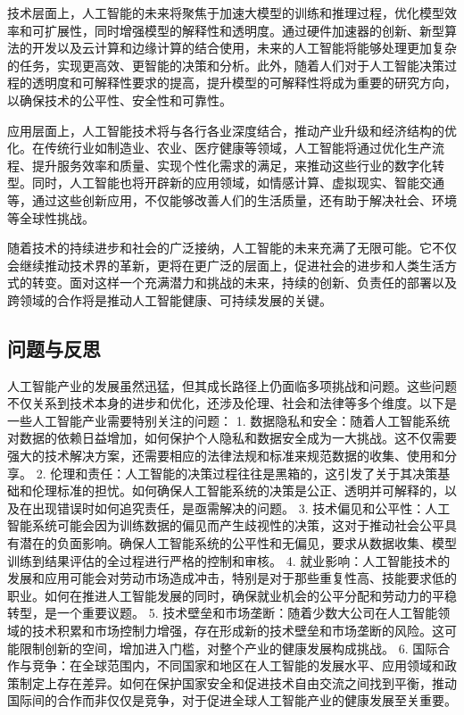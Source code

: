 技术层面上，人工智能的未来将聚焦于加速大模型的训练和推理过程，优化模型效率和可扩展性，同时增强模型的解释性和透明度。通过硬件加速器的创新、新型算法的开发以及云计算和边缘计算的结合使用，未来的人工智能将能够处理更加复杂的任务，实现更高效、更智能的决策和分析。此外，随着人们对于人工智能决策过程的透明度和可解释性要求的提高，提升模型的可解释性将成为重要的研究方向，以确保技术的公平性、安全性和可靠性。

应用层面上，人工智能技术将与各行各业深度结合，推动产业升级和经济结构的优化。在传统行业如制造业、农业、医疗健康等领域，人工智能将通过优化生产流程、提升服务效率和质量、实现个性化需求的满足，来推动这些行业的数字化转型。同时，人工智能也将开辟新的应用领域，如情感计算、虚拟现实、智能交通等，通过这些创新应用，不仅能够改善人们的生活质量，还有助于解决社会、环境等全球性挑战。

随着技术的持续进步和社会的广泛接纳，人工智能的未来充满了无限可能。它不仅会继续推动技术界的革新，更将在更广泛的层面上，促进社会的进步和人类生活方式的转变。面对这样一个充满潜力和挑战的未来，持续的创新、负责任的部署以及跨领域的合作将是推动人工智能健康、可持续发展的关键。

\subsection{问题与反思}
人工智能产业的发展虽然迅猛，但其成长路径上仍面临多项挑战和问题。这些问题不仅关系到技术本身的进步和优化，还涉及伦理、社会和法律等多个维度。以下是一些人工智能产业需要特别关注的问题：
1. 数据隐私和安全：随着人工智能系统对数据的依赖日益增加，如何保护个人隐私和数据安全成为一大挑战。这不仅需要强大的技术解决方案，还需要相应的法律法规和标准来规范数据的收集、使用和分享。
2. 伦理和责任：人工智能的决策过程往往是黑箱的，这引发了关于其决策基础和伦理标准的担忧。如何确保人工智能系统的决策是公正、透明并可解释的，以及在出现错误时如何追究责任，是亟需解决的问题。
3. 技术偏见和公平性：人工智能系统可能会因为训练数据的偏见而产生歧视性的决策，这对于推动社会公平具有潜在的负面影响。确保人工智能系统的公平性和无偏见，要求从数据收集、模型训练到结果评估的全过程进行严格的控制和审核。
4. 就业影响：人工智能技术的发展和应用可能会对劳动市场造成冲击，特别是对于那些重复性高、技能要求低的职业。如何在推进人工智能发展的同时，确保就业机会的公平分配和劳动力的平稳转型，是一个重要议题。
5. 技术壁垒和市场垄断：随着少数大公司在人工智能领域的技术积累和市场控制力增强，存在形成新的技术壁垒和市场垄断的风险。这可能限制创新的空间，增加进入门槛，对整个产业的健康发展构成挑战。
6. 国际合作与竞争：在全球范围内，不同国家和地区在人工智能的发展水平、应用领域和政策制定上存在差异。如何在保护国家安全和促进技术自由交流之间找到平衡，推动国际间的合作而非仅仅是竞争，对于促进全球人工智能产业的健康发展至关重要。

